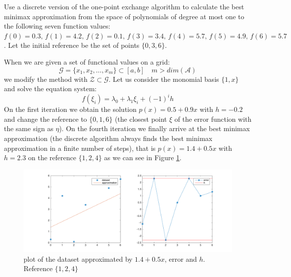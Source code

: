 \begin{problem}
  Use a discrete version of the one-point exchange algorithm to
  calculate the best minimax approximation from the space of
  polynomials of degree at most one to the following seven function
  values: $f (0) = 0.3,\, f (1) = 4.2,\, f (2) = 0.1,\, f (3) = 3.4,\, f (4) =
  5.7,\, f (5) = 4.9,\, f (6) = 5.7$. Let the initial reference be the set
  of points $\{0, 3, 6\}$.
\end{problem}

\begin{solution}
When we are given a set of functional values on a grid:
\begin{equation*}
\mathcal{G} = \{x_1,x_2,\ldots,x_m\} \subset [a,b] \quad m>dim(\mathcal{A})
\end{equation*}
we modify the method with $\mathcal{Z} \subset \mathcal{G}$. Let us consider the monomial basis $\{1,x\}$ and solve the equation system:
\begin{equation*}
f(\xi_i)=\lambda_0+\lambda_1\xi_i + (-1)^ih
\end{equation*}
On the first iteration we obtain the solution $p(x) = 0.5 + 0.9x$ with $h=-0.2$ and change the reference to $\{0, 1, 6\}$ (the closest point $\xi$ of the error function with the same sign as $\eta$). On the fourth iteration we finally arrive at the best minimax approximation (the discrete algorithm always finds the best minimax approximation in a finite number of steps), that is $p(x) = 1.4 + 0.5x$ with $h = 2.3$ on the reference $\{1, 2, 4\}$ as we can see in Figure \ref{discreteminimax}.
\begin{figure}[h]
\centering 
\includegraphics[scale = 0.25]{hwk5t3.png}
\caption{plot of the dataset approximated by $1.4 + 0.5x$, error and $h$. Reference $\{1,2,4\}$}
\label{discreteminimax}
\end{figure}
\end{solution}

